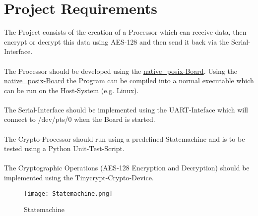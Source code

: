 %
%
%
%
%


\section{Project Requirements}

The Project consists of the creation of a Processor which can receive data, then
encrypt or decrypt this data using AES-128 and then send it back via the
Serial-Interface.
\\
\\
The Processor should be developed using the
\href{https://docs.zephyrproject.org/2.0.0/boards/posix/native_posix/doc/index.html?highlight=native_posix}
{native\_posix-Board}.
Using the
\href{https://docs.zephyrproject.org/2.0.0/boards/posix/native_posix/doc/index.html?highlight=native_posix}
{native\_posix-Board} the Program can be compiled into a normal
executable which can be run on the Host-System (e.g. Linux).
\\
\\
The Serial-Interface should be implemented using the UART-Inteface which will connect to
/dev/pts/0 when the Board is started.
\\
\\
The Crypto-Processor should run using a predefined Statemachine and is to be
tested using a Python Unit-Test-Script.
\\
\\
The Cryptographic Operations (AES-128 Encryption and Decryption) should be implemented
using the Tinycrypt-Crypto-Device.

\begin{figure}[!ht]
	\begin{center}
		\texttt{[image: Statemachine.png]}
		\caption{Statemachine}
	\end{center}
\end{figure}

\pagebreak

